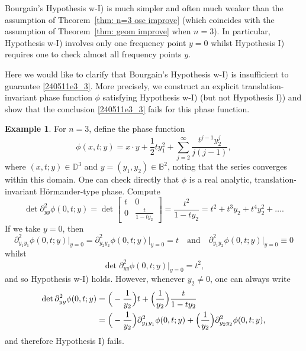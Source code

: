 \documentclass[reqno]{amsart}
\numberwithin{equation}{section}
\newcommand{\B}{\mathbb{B}}
\newcommand{\D}{\mathbb{D}}
\theoremstyle{plain}
\theoremstyle{definition}
\newtheorem{example}[theorem]{Example}
\begin{document}
Bourgain's Hypothesis w-I) is much simpler and often much weaker than the assumption of Theorem~\ref{thm: n=3 osc improve} (which coincides with the assumption of Theorem~\ref{thm: geom improve} when $n=3$).  In particular, Hypothesis w-I) involves only one frequency point $y=0$ whilst Hypothesis I) requires one to check almost all frequency points $y$. 


Here we would like to clarify that Bourgain's Hypothesis w-I) is insufficient to guarantee \eqref{240511e3_3}. More precisely, we construct an explicit translation-invariant phase function $\phi$ satisfying Hypothesis w-I) (but not Hypothesis I))  and show that the conclusion \eqref{240511e3_3} fails for this phase function. 

\begin{example} For $n=3$, define the phase function 
\begin{equation*}
    \phi(x, t; y)=
    x \cdot y +
\frac{1}{2} t y_1^2+
\sum_{j=2}^{\infty} \frac{t^{j-1}y_2^j}{
j(j-1)
},
\end{equation*}
where $(x,t;y) \in \D^3$ and $y = (y_1, y_2) \in \B^2$, noting that the series converges within this domain. One can check directly that $\phi$ is a real analytic, translation-invariant H\"ormander-type phase. Compute
\begin{equation*}
    \det \partial^2_{yy} \phi(0, t; y)=
    \det
    \begin{bmatrix}
        t & 0\\
        0 & \frac{t}{1-ty_2}
    \end{bmatrix}
    = \frac{t^2}{1-ty_2} =
    t^2+ t^3 y_2+ t^4 y_2^2+\dots .
\end{equation*}
If we take $y=0$, then 
\begin{equation*}
  \partial^2_{y_1y_1} \phi(0, t; y)\big|_{y=0} = \partial^2_{y_2y_2} \phi(0, t; y)\big|_{y=0} = t \quad \textrm{and} \quad \partial^2_{y_1y_2} \phi(0, t; y)\big|_{y=0} \equiv 0
\end{equation*}
whilst
\begin{equation*}
    \det 
    \partial^2_{yy} \phi(0, t; y)\big|_{y=0} =
    t^2,
\end{equation*}
and so Hypothesis w-I) holds. However, whenever $y_2\neq 0$, one can always write 
\begin{align*}
    \det 
    \partial^2_{yy}\phi(0, t; y) &= 
    \Big(
    -\frac{1}{y_2}
    \Big) t+
    \Big(
    \frac{1}{y_2}
    \Big) \frac{t}{1-ty_2} \\
    &= \Big(-\frac{1}{y_2}\Bigr) \partial_{y_1y_1}^2\phi(0,t;y) + \Bigl(\frac{1}{y_2}\Bigr) \partial_{y_2y_2}^2\phi(0,t;y), 
\end{align*}
and therefore Hypothesis I) fails. \medskip


\end{example}
\end{document}
